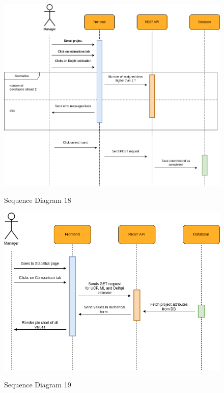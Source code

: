 \begin{figure}[H]
    \centering
    \caption{Sequence Diagram 18}
    \includegraphics[scale=0.5]{./diagrams/sequence/seq-18.png}
    \label{fig:seq-18}
    
\end{figure}


\begin{figure}[H]
    \centering
    \caption{Sequence Diagram 19}
    \includegraphics[scale=0.5]{./diagrams/sequence/seq-19.png}
    \label{fig:seq-19}
    
\end{figure}

